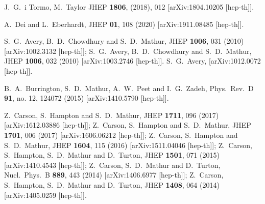 \documentclass[11pt]{article}
\begin{document}
\begin{thebibliography}{99}
  J.~G.~i Tormo, M.~Taylor
   JHEP {\bf 1806}, (2018), 012
    [arXiv:1804.10205 [hep-th]].
    
A.~Dei and L.~Eberhardt,
JHEP \textbf{01}, 108 (2020)
[arXiv:1911.08485 [hep-th]].



  S.~G.~Avery, B.~D.~Chowdhury and S.~D.~Mathur,
  JHEP {\bf 1006}, 031 (2010)
  [arXiv:1002.3132 [hep-th]]; 
  S.~G.~Avery, B.~D.~Chowdhury and S.~D.~Mathur,
  JHEP {\bf 1006}, 032 (2010)
  [arXiv:1003.2746 [hep-th]].
  S.~G.~Avery,
[arXiv:1012.0072 [hep-th]].

  B.~A.~Burrington, S.~D.~Mathur, A.~W.~Peet and I.~G.~Zadeh,
  Phys.\ Rev.\ D {\bf 91}, no. 12, 124072 (2015)
  [arXiv:1410.5790 [hep-th]].

  
  Z.~Carson, S.~Hampton and S.~D.~Mathur,
  JHEP {\bf 1711}, 096 (2017)
  [arXiv:1612.03886 [hep-th]]; 
  Z.~Carson, S.~Hampton and S.~D.~Mathur,
  JHEP {\bf 1701}, 006 (2017)
  [arXiv:1606.06212 [hep-th]]; 
  Z.~Carson, S.~Hampton and S.~D.~Mathur,
  JHEP {\bf 1604}, 115 (2016)
  [arXiv:1511.04046 [hep-th]]; 
  Z.~Carson, S.~Hampton, S.~D.~Mathur and D.~Turton,
  JHEP {\bf 1501}, 071 (2015)
  [arXiv:1410.4543 [hep-th]]; 
   Z.~Carson, S.~D.~Mathur and D.~Turton,
  Nucl.\ Phys.\ B {\bf 889}, 443 (2014)
  [arXiv:1406.6977 [hep-th]]; 
  Z.~Carson, S.~Hampton, S.~D.~Mathur and D.~Turton,
  JHEP {\bf 1408}, 064 (2014)
  [arXiv:1405.0259 [hep-th]].


\end{thebibliography}
\end{document}
